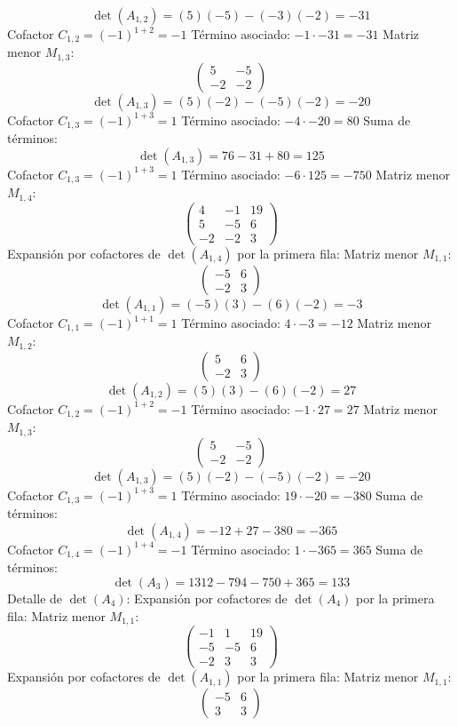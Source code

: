 \documentclass{article}
\begin{document}
\[\det(A_{1,2}) = (5)(-5) - (-3)(-2) = -31\]
Cofactor $C_{1,2} = (-1)^{1+2} = -1$
Término asociado: $ -1 \cdot -31 = -31 $
Matriz menor $M_{1,3}$:
\[\begin{pmatrix}5 & -5 \\ -2 & -2\end{pmatrix}\]
\[\det(A_{1,3}) = (5)(-2) - (-5)(-2) = -20\]
Cofactor $C_{1,3} = (-1)^{1+3} = 1$
Término asociado: $ -4 \cdot -20 = 80 $
Suma de términos:
\[\det(A_{1,3}) = 76 - 31 + 80 = 125\]
Cofactor $C_{1,3} = (-1)^{1+3} = 1$
Término asociado: $ -6 \cdot 125 = -750 $
Matriz menor $M_{1,4}$:
\[\begin{pmatrix}4 & -1 & 19 \\ 5 & -5 & 6 \\ -2 & -2 & 3\end{pmatrix}\]
Expansión por cofactores de $\det(A_{1,4})$ por la primera fila:
Matriz menor $M_{1,1}$:
\[\begin{pmatrix}-5 & 6 \\ -2 & 3\end{pmatrix}\]
\[\det(A_{1,1}) = (-5)(3) - (6)(-2) = -3\]
Cofactor $C_{1,1} = (-1)^{1+1} = 1$
Término asociado: $ 4 \cdot -3 = -12 $
Matriz menor $M_{1,2}$:
\[\begin{pmatrix}5 & 6 \\ -2 & 3\end{pmatrix}\]
\[\det(A_{1,2}) = (5)(3) - (6)(-2) = 27\]
Cofactor $C_{1,2} = (-1)^{1+2} = -1$
Término asociado: $ -1 \cdot 27 = 27 $
Matriz menor $M_{1,3}$:
\[\begin{pmatrix}5 & -5 \\ -2 & -2\end{pmatrix}\]
\[\det(A_{1,3}) = (5)(-2) - (-5)(-2) = -20\]
Cofactor $C_{1,3} = (-1)^{1+3} = 1$
Término asociado: $ 19 \cdot -20 = -380 $
Suma de términos:
\[\det(A_{1,4}) = -12 + 27 - 380 = -365\]
Cofactor $C_{1,4} = (-1)^{1+4} = -1$
Término asociado: $ 1 \cdot -365 = 365 $
Suma de términos:
\[\det(A_{3}) = 1312 - 794 - 750 + 365 = 133\]
Detalle de $\det(A_{4})$:
Expansión por cofactores de $\det(A_{4})$ por la primera fila:
Matriz menor $M_{1,1}$:
\[\begin{pmatrix}-1 & 1 & 19 \\ -5 & -5 & 6 \\ -2 & 3 & 3\end{pmatrix}\]
Expansión por cofactores de $\det(A_{1,1})$ por la primera fila:
Matriz menor $M_{1,1}$:
\[\begin{pmatrix}-5 & 6 \\ 3 & 3\end{pmatrix}\]
\end{document}

